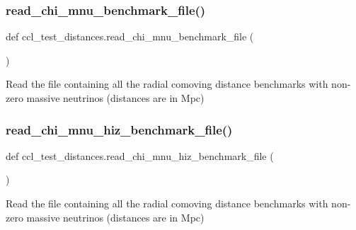 \subsubsection{\texorpdfstring{read\+\_\+chi\+\_\+mnu\+\_\+benchmark\+\_\+file()}{read\_chi\_mnu\_benchmark\_file()}}
{\footnotesize\ttfamily def ccl\+\_\+test\+\_\+distances.\+read\+\_\+chi\+\_\+mnu\+\_\+benchmark\+\_\+file (\begin{DoxyParamCaption}{ }\end{DoxyParamCaption})}

\begin{DoxyVerb}Read the file containing all the radial comoving distance benchmarks
with non-zero massive neutrinos
(distances are in Mpc)
\end{DoxyVerb}
 \mbox{\label{namespaceccl__test__distances_a8beea150fa105c5af9c4da704ab7981f}} 
\subsubsection{\texorpdfstring{read\+\_\+chi\+\_\+mnu\+\_\+hiz\+\_\+benchmark\+\_\+file()}{read\_chi\_mnu\_hiz\_benchmark\_file()}}
{\footnotesize\ttfamily def ccl\+\_\+test\+\_\+distances.\+read\+\_\+chi\+\_\+mnu\+\_\+hiz\+\_\+benchmark\+\_\+file (\begin{DoxyParamCaption}{ }\end{DoxyParamCaption})}

\begin{DoxyVerb}Read the file containing all the radial comoving distance benchmarks
with non-zero massive neutrinos
(distances are in Mpc)
\end{DoxyVerb}
 \mbox{\label{namespaceccl__test__distances_a566ae859d5f0e8fb3179c594234d7100}} 

